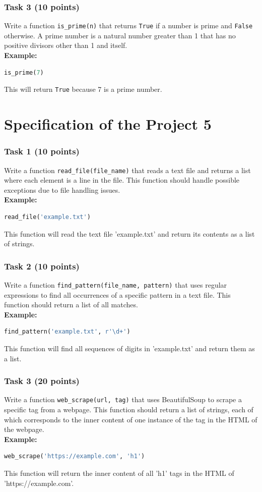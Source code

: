 \documentclass[12pt]{book}
\begin{document}
\subsubsection{Task 3 (10 points)}
Write a function \texttt{is\_prime(n)} that returns \texttt{True} if a number is prime and \texttt{False} otherwise. A prime number is a natural number greater than 1 that has no positive divisors other than 1 and itself. \\
\textbf{Example:}
\begin{lstlisting}[language=Python]
is_prime(7)
\end{lstlisting}
This will return \texttt{True} because 7 is a prime number.

\newpage
\section{Specification of the Project 5}

\subsubsection{Task 1 (10 points)}
Write a function \texttt{read\_file(file\_name)} that reads a text file and returns a list where each element is a line in the file. This function should handle possible exceptions due to file handling issues. \\
\textbf{Example:}
\begin{lstlisting}[language=Python]
read_file('example.txt')
\end{lstlisting}
This function will read the text file 'example.txt' and return its contents as a list of strings.

\subsubsection{Task 2 (10 points)}
Write a function \texttt{find\_pattern(file\_name, pattern)} that uses regular expressions to find all occurrences of a specific pattern in a text file. This function should return a list of all matches. \\
\textbf{Example:}
\begin{lstlisting}[language=Python]
find_pattern('example.txt', r'\d+')
\end{lstlisting}
This function will find all sequences of digits in 'example.txt' and return them as a list.

\subsubsection{Task 3 (20 points)}
Write a function \texttt{web\_scrape(url, tag)} that uses BeautifulSoup to scrape a specific tag from a webpage. This function should return a list of strings, each of which corresponds to the inner content of one instance of the tag in the HTML of the webpage. \\
\textbf{Example:}
\begin{lstlisting}[language=Python]
web_scrape('https://example.com', 'h1')
\end{lstlisting}
This function will return the inner content of all 'h1' tags in the HTML of 'https://example.com'.
\newpage
\end{document}
